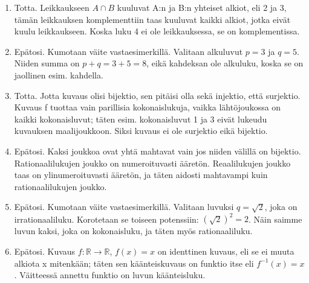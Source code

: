 \documentclass[a4paper,12pt]{article}
\begin{document}
\begin{enumerate}
    \begin{enumerate}
        \item Totta. Leikkaukseen $A \cap B$ kuuluvat A:n ja B:n yhteiset alkiot, eli 2 ja 3, tämän leikkauksen komplementtiin taas kuuluvat kaikki alkiot, jotka eivät kuulu leikkaukseen. Koska luku 4 ei ole leikkauksessa, se on komplementissa. 
        \item Epätosi. Kumotaan väite vastaesimerkillä. Valitaan alkuluvut $p=3$ ja $q=5$. Niiden summa on $p+q=3+5=8$, eikä kahdeksan ole alkuluku, koska se on jaollinen esim. kahdella. 
        \item Totta. Jotta kuvaus olisi bijektio, sen pitäisi olla sekä injektio, että surjektio. Kuvaus f tuottaa vain parillisia kokonaislukuja, vaikka lähtöjoukossa on kaikki kokonaisluvut; täten esim. kokonaisluvut 1 ja 3 eivät lukeudu kuvauksen maalijoukkoon. Siksi kuvaus ei ole surjektio eikä bijektio. 
        \item Epätosi. Kaksi joukkoa ovat yhtä mahtavat vain jos niiden välillä on bijektio. Rationaalilukujen joukko on numeroituvasti ääretön. Reaalilukujen joukko taas on ylinumeroituvasti ääretön, ja täten aidosti mahtavampi kuin rationaalilukujen joukko. 
        \item Epätosi. Kumotaan väite vastaesimerkillä. Valitaan luvuksi $q=\sqrt{2}$, joka on irrationaaliluku. Korotetaan se toiseen potenssiin: $(\sqrt{2})^2=2$. Näin saimme luvun kaksi, joka on kokonaisluku, ja täten myös rationaaliluku. 
        \item Epätosi. Kuvaus $f:\mathbb{R}\to\mathbb{R}$, $f(x)=x$ on identtinen kuvaus, eli se ei muuta alkiota x mitenkään; täten sen käänteiskuvaus on funktio itse eli $f^{-1}(x)=x$. Väitteessä annettu funktio on luvun käänteisluku. 
    \end{enumerate}
    
\end{enumerate}
\end{document}
